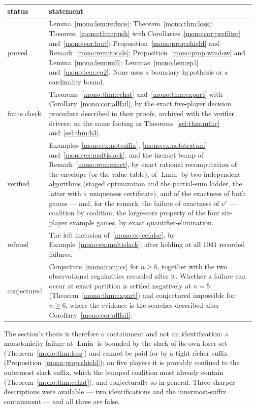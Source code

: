 \documentclass[11pt]{article}
\newcommand{\Lmin}{\operatorname{Lmin}}
\begin{document}
\begin{center}
\begin{tabular}{lp{}}
\toprule
\textbf{status} & \textbf{statement}\\
\midrule
proved &
 Lemma~\ref{mono:lem:reduce}; Theorem~\ref{mono:thm:loss};
 Theorem~\ref{mono:thm:push} with
 Corollaries~\ref{mono:cor:prefilter} and~\ref{mono:cor:lout};
 Proposition~\ref{mono:prop:shield} and Remark~\ref{mono:rem:totals};
 Proposition~\ref{mono:prop:window} and Lemma~\ref{mono:lem:null};
 Lemmas~\ref{mono:lem:ep1} and~\ref{mono:lem:ep2}.  None
 uses a boundary hypothesis or a cardinality bound.\\
finite check &
 Theorems~\ref{mono:thm:cchat} and~\ref{mono:thm:expart} with
 Corollary~\ref{mono:cor:allfail}, by the exact five-player decision
 procedure described in their proofs, archived with the verifier drivers;
 on the same footing as Theorems~\ref{sel:thm:mthr} and~\ref{sel:thm:h3}.\\
verified &
 Examples~\ref{mono:ex:notsuffix}, \ref{mono:ex:notstratum}
 and~\ref{mono:ex:multislack}, and the
 inexact bump of Remark~\ref{mono:rem:exact}, by exact rational
 recomputation of the envelope (or the value table), of $\Lmin$ by two
 independent algorithms
 (staged optimization and the partial-sum ladder, the latter with a
 uniqueness certificate), and of the exactness of both games --- and, for the
 remark, the failure of exactness of $v'$ --- coalition by coalition; the
 large-core property of the four six-player example games, by exact
 quantifier-elimination.\\
refuted &
 The left inclusion of~\eqref{mono:eq:ccfalse}, by
 Example~\ref{mono:ex:multislack}, after holding at all $1041$ recorded
 failures.\\
conjectured &
 Conjecture~\ref{mono:conj:cc} for $n\ge6$, together with the two
 observational regularities recorded after it.  Whether a failure can occur
 at exact partition is settled negatively at $n=5$
 (Theorem~\ref{mono:thm:expart}) and conjectured impossible for $n\ge6$,
 where the evidence is the searches described after
 Corollary~\ref{mono:cor:allfail}.\\
\bottomrule
\end{tabular}
\end{center}

The section's thesis is therefore a containment and not an identification:
a monotonicity failure at $\Lmin$ is bounded by the slack of its own loser
set (Theorem~\ref{mono:thm:loss}) and cannot be paid for by a tight richer
suffix (Proposition~\ref{mono:prop:shield}); on five players it is provably
confined to the outermost slack suffix, which the bumped coalition must
already contain (Theorem~\ref{mono:thm:cchat}), and conjecturally so in
general.  Three sharper descriptions were available --- two identifications
and the innermost-suffix containment --- and all three are false.
\end{document}
